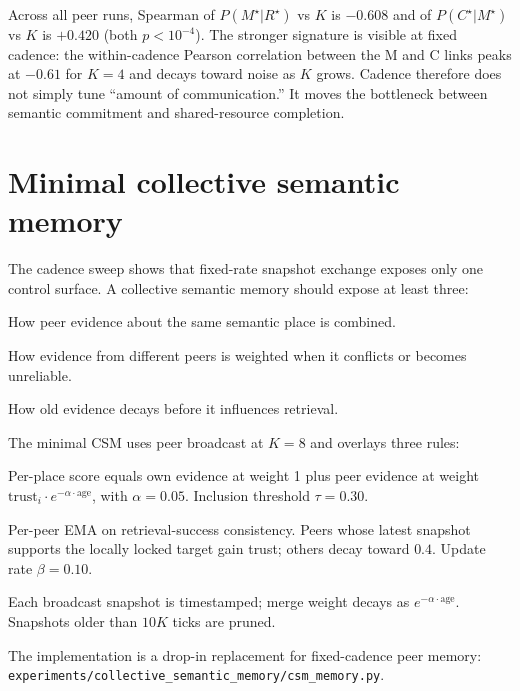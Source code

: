 \documentclass{article}
\newcommand{\method}[1]{\texttt{#1}}
\begin{document}
Across all peer runs, Spearman of $P(M^\star|R^\star)$ vs $K$ is
$-0.608$ and of $P(C^\star|M^\star)$ vs $K$ is $+0.420$ (both
$p<10^{-4}$). The stronger signature is visible at fixed cadence:
the within-cadence Pearson correlation between the M and C links peaks
at $-0.61$ for $K{=}4$ and decays toward noise as $K$ grows. Cadence
therefore does not simply tune ``amount of communication.'' It moves
the bottleneck between semantic commitment and shared-resource
completion.

\section{Minimal collective semantic memory}
\label{sec:csm}

The cadence sweep shows that fixed-rate snapshot exchange exposes only
one control surface. A collective semantic memory should expose at
least three:
\begin{description}[leftmargin=14pt,itemsep=1pt,topsep=2pt]
\item[Merge.] How peer evidence about the same semantic place is combined.
\item[Trust.] How evidence from different peers is weighted when it conflicts or becomes unreliable.
\item[Staleness.] How old evidence decays before it influences retrieval.
\end{description}

The minimal CSM uses peer broadcast at $K{=}8$ and overlays three
rules:
\begin{description}[leftmargin=14pt,itemsep=1pt,topsep=2pt]
\item[\textit{Merge.}] Per-place score equals own evidence at weight 1 plus peer evidence at weight $\mathrm{trust}_i \cdot e^{-\alpha \cdot \mathrm{age}}$, with $\alpha=0.05$. Inclusion threshold $\tau=0.30$.
\item[\textit{Trust.}] Per-peer EMA on retrieval-success consistency. Peers whose latest snapshot supports the locally locked target gain trust; others decay toward $0.4$. Update rate $\beta=0.10$.
\item[\textit{Staleness.}] Each broadcast snapshot is timestamped; merge weight decays as $e^{-\alpha\cdot\mathrm{age}}$. Snapshots older than $10K$ ticks are pruned.
\end{description}

The implementation is a drop-in replacement for fixed-cadence peer
memory: \method{experiments/collective\_semantic\_memory/csm\_memory.py}.
\end{document}
